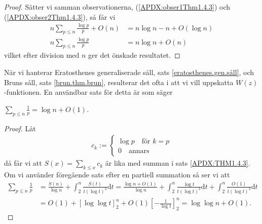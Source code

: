 \begin{proof}
Sätter vi samman observationerna, (\ref{APDX:obser1Thm1.4.3}) och (\ref{APDX:obser2Thm1.4.3}), så får vi 
\begin{align*}
    n \sum_{p \leq n} \frac{\log p}{p} + O(n) &= n \log n - n + O(\log n) \\
    n \sum_{p \leq n} \frac{\log p}{p} &= n \log n + O(n)
\end{align*}
vilket efter division med $n$ ger det önskade resultatet.
\end{proof}

När vi hanterar Eratosthenes generaliserade såll, sats \ref{eratosthenes.gen.såll}, och Bruns såll, sats \ref{brun.thm.brun}, resulterar det ofta i att vi vill uppskatta \(W(z)\)-funktionen. En användbar sats för detta är \cite[Sats 1.4.4]{cojocarumurty} som säger
\begin{theorem} \label{APDX:THM1.4.4}
    \(\sum_{p \leq n} \frac{1}{p} = \log n + O(1)\).
\end{theorem}
\begin{proof}
Låt
\begin{align*}
    c_k := 
    \begin{cases}
    \log p \quad \text{för } k = p \\
    0 \quad \text{annars}
    \end{cases}
\end{align*}
då får vi att \(S(x) = \sum_{k \leq x} c_k\) är lika med summan i sats \ref{APDX:THM1.4.3}. Om vi använder föregående sats efter en partiell summation så ser vi att
\begin{align*}
    \sum_{p \leq n} \frac{1}{p} &= \frac{S(n)}{\log n} + \int_2^n \frac{S(t)}{t(\log t)^2} \text{d}t 
    = \frac{\log n + O(1)}{\log n} + \int_2^n \frac{\log t}{t(\log t)^2} \text{d}t + \int_2^n \frac{O(1)}{t(\log t)^2} \text{d}t \\
    &= O(1) + \left[\log \log t \right]_2^n + O(1) \left[- \frac{1}{\log t} \right]_2^n
    = \log \log n  + O(1).
\end{align*}

\end{proof}